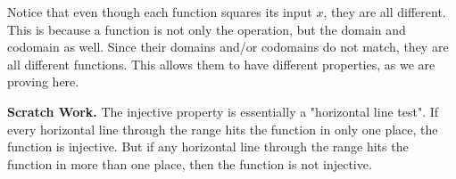 \documentclass{amsart}
\theoremstyle{definition}
\theoremstyle{definition}
\theoremstyle{remark}
\begin{document}
Notice that even though each function squares its input $x$, they are all different. This is because a function is not only the operation, but the domain and codomain as well. Since their domains and/or codomains do not match, they are all different functions. This allows them to have different properties, as we are proving here.


\noindent \textbf{Scratch Work.} The injective property is essentially a "horizontal line test". If every horizontal line through the range hits the function in only one place, the function is injective. But if any horizontal line through the range hits the function in more than one place, then the function is not injective.

\begin{center}
\begin{tabular}{c c c}


\end{tabular}
\end{center}
\end{document}
